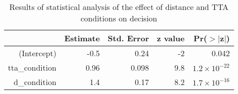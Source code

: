 \begin{table*}[!h]
\centering
\caption{Results of statistical analysis of the effect of distance and TTA conditions on decision} 
\label{tab:decision}
\begin{tabular}{rrrrr}
  \toprule
 & Estimate & Std. Error & z value & Pr($>$$|$z$|$) \\ 
  \midrule
(Intercept) & -0.5 & 0.24 &  -2 & 0.042 \\ 
  tta\_condition & 0.96 & 0.098 & 9.8 & $1.2 \times 10^{-22}$ \\ 
  d\_condition & 1.4 & 0.17 & 8.2 & $1.7 \times 10^{-16}$ \\ 
   \bottomrule
\end{tabular}
\end{table*}
